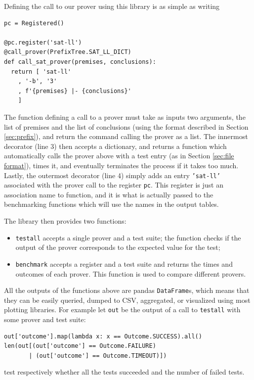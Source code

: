 Defining the call to our prover using this library is as simple as writing
\begin{verbatim}
pc = Registered()

@pc.register('sat-ll')
@call_prover(PrefixTree.SAT_LL_DICT)
def call_sat_prover(premises, conclusions):
  return [ 'sat-ll'
    , '-b', '3'
    , f'{premises} |- {conclusions}'
    ]
\end{verbatim}
The function defining a call to a prover must take as inputs two arguments, the list of premises and the list of conclusions (using the format described in Section \ref{sec:prefix}), and return the command calling the prover as a list.
The innermost decorator (line 3) then accepts a dictionary, and returns a function which automatically calls the prover above with a test entry (as in Section \ref{sec:file format}), times it, and eventually terminates the process if it takes too much.
Lastly, the outermost decorator (line 4) simply adds an entry \texttt{'sat-ll'} associated with the prover call to the register \texttt{pc}.
This register is just an association name to function, and it is what is actually passed to the benchmarking functions which will use the names in the output tables.

The library then provides two functions:
\begin{itemize}
	\item \texttt{testall} accepts a single prover and a test suite; the function checks if the output of the prover corresponds to the expected value for the test;
	\item \texttt{benchmark} accepts a register and a test suite and returns the times and outcomes of each prover.
		This function is used to compare different provers.
\end{itemize}
All the outputs of the functions above are pandas \texttt{DataFrame}s, which means that they can be easily queried, dumped to CSV, aggregated, or visualized using most plotting libraries.
For example let \texttt{out} be the output of a call to \texttt{testall} with some prover and test suite:
\begin{verbatim}
out['outcome'].map(lambda x: x == Outcome.SUCCESS).all()
len(out[(out['outcome'] == Outcome.FAILURE) 
       | (out['outcome'] == Outcome.TIMEOUT)])
\end{verbatim}
test respectively whether all the tests succeeded and the number of failed tests.

